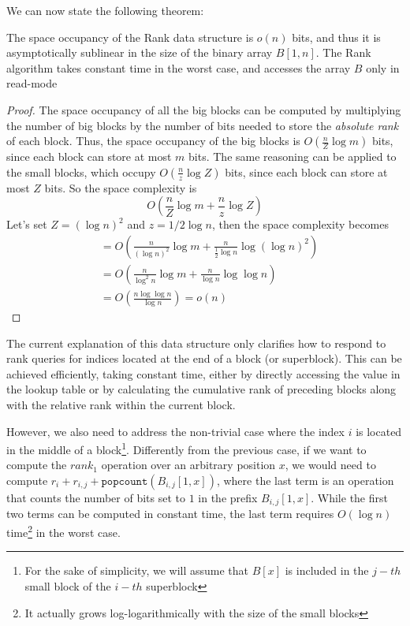 \noindent We can now state the following theorem:

\begin{theorem} \label{th:rank}
    The space occupancy of the Rank data structure is $o(n)$ bits, and thus it is asymptotically sublinear in the size of the binary array $B[1, n]$. The Rank algorithm takes constant time in the worst case, and accesses the array $B$ only in read-mode
\end{theorem}
\begin{proof}
    The space occupancy of all the big blocks can be computed by multiplying the number of big blocks by the number of bits needed to store the \emph{absolute rank} of each block. Thus, the space occupancy of the big blocks is $O(\frac{n}{Z} \log m)$ bits, since each block can store at most $m$ bits. The same reasoning can be applied to the small blocks, which occupy $O(\frac{n}{z} \log Z)$ bits, since each block can store at most $Z$ bits. So the space complexity is
    \begin{equation}
        O\left(\frac{n}{Z} \log m + \frac{n}{z} \log Z\right)
    \end{equation}
    Let's set $Z = (\log n)^2$ and $z = 1/2 \log n$, then the space complexity becomes
    \begin{align}
         & = O\left(\frac{n}{(\log n)^2} \log m + \frac{n}{\frac{1}{2} \log n} \log (\log n)^2\right) \\
         & = O\left(\frac{n}{\log^2n} \log m + \frac{n}{\log n} \log \log n\right)                    \\
         & = O\left(\frac{n \log \log n}{\log n} \right)= o(n)
    \end{align}
\end{proof}

\noindent The current explanation of this data structure only clarifies how to respond to rank queries for indices located at the end of a block (or superblock). This can be achieved efficiently, taking constant time, either by directly accessing the value in the lookup table or by calculating the cumulative rank of preceding blocks along with the relative rank within the current block. \vspace{0.4cm}

\noindent However, we also need to address the non-trivial case where the index $i$ is located in the middle of a block\footnote{For the sake of simplicity, we will assume that $B[x]$ is included in the $j-th$ small block of the $i-th$ superblock}. Differently from the previous case, if we want to compute the $rank_1$ operation over an arbitrary position $x$, we would need to compute $r_i + r_{i,j} + \texttt{popcount}(B_{i,j}[1,x])$, where the last term is an operation that counts the number of bits set to $1$ in the prefix $B_{i,j}[1,x]$. While the first two terms can be computed in constant time, the last term requires $O(\log n)$ time\footnote{It actually grows log-logarithmically with the size of the small blocks} in the worst case.

